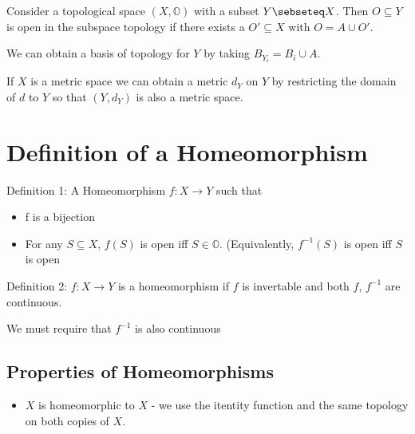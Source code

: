 \documentclass{homework}
\newcommand{\OO}{\mathbb{O}}
\begin{document}
Consider a topological space $(X, \OO)$ with a subset $Y \sebseteq X$. Then $O \subseteq Y$ is open in the subspace topology if there exists a $O' \subseteq X$ with $O = A \cup O'$.

We can obtain a basis of topology for $Y$ by taking $B_{Y_i} = B_i \cup A.$

If $X$ is a metric space we can obtain a metric $d_Y$ on $Y$ by restricting the domain of $d$ to $Y$  so that $(Y,d_Y)$ is also a metric space.


\section{Definition of a Homeomorphism}

Definition 1: A Homeomorphism $f:X \rightarrow Y$ such that 
\begin{itemize}
    \item {f is a bijection}
    \item{For any $S \subseteq X$, $f(S)$ is open iff $S \in \OO$. (Equivalently, $f^{-1}(S)$ is open iff $S$ is open}
\end{itemize}

Definition 2: $f: X \rightarrow Y$ is a homeomorphism if $f$ is invertable and both $f$, $f^{-1}$ are continuous. 

We must require that $f^{-1}$ is also continuous




\subsection{Properties of Homeomorphisms}

\begin{itemize}
    \item $X$ is homeomorphic to $X$ - we use the itentity function and the same topology on both copies of $X$. 
\end{itemize}
\end{document}
